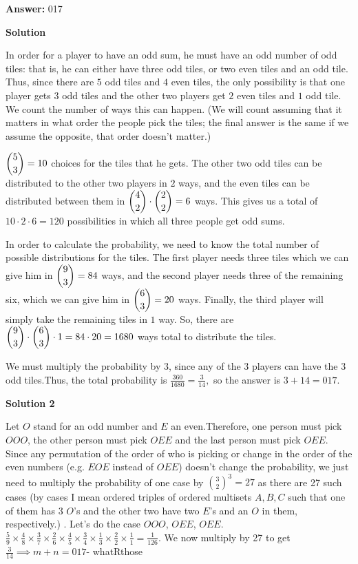 \begin{enumerate}
 \textbf{Answer: }017



\textbf{Solution}

In order for a player to have an odd sum, he must have an odd number of odd tiles: that is, he can either have three odd tiles, or two even tiles and an odd tile.  Thus, since there are $5$ odd tiles and $4$ even tiles, the only possibility is that one player gets $3$ odd tiles and the other two players get $2$ even tiles and $1$ odd tile.  We count the number of ways this can happen. (We will count assuming that it matters in what order the people pick the tiles; the final answer is the same if we assume the opposite, that order doesn't matter.)

 $\dbinom{5}{3} = 10$ choices for the tiles that he gets.  The other two odd tiles can be distributed to the other two players in $2$ ways, and the even tiles can be distributed between them in $\dbinom{4}{2} \cdot \dbinom{2}{2} = 6$ ways.  This gives us a total of  $10 \cdot 2 \cdot 6 = 120$ possibilities in which all three people get odd sums.

 In order to calculate the probability, we need to know the total number of possible distributions for the tiles.  The first player needs three tiles which we can give him in $\dbinom{9}{3} = 84$ ways, and the second player needs three of the remaining six, which we can give him in $\dbinom{6}{3} = 20$ ways. Finally, the third player will simply take the remaining tiles in $1$ way. So, there are $\dbinom{9}{3} \cdot \dbinom{6}{3} \cdot 1 = 84 \cdot 20 = 1680$ ways total to distribute the tiles.

 We must multiply the probability by 3, since any of the 3 players can have the 3 odd tiles.Thus, the total probability is $\frac{360}{1680} = \frac{3}{14},$ so the answer is $3 + 14 = \boxed{017}$.

 



\textbf{Solution 2}

Let $O$ stand for an odd number and $E$ an even.Therefore, one person must pick $OOO$, the other person must pick $OEE$ and the last person must pick $OEE$. Since any permutation of the order of who is picking or change in the order of the even numbers (e.g. $EOE$ instead of $OEE$) doesn't change the probability, we just need to multiply the probability of one case by $\binom{3}{2}^3 = 27$ as there are 27 such cases (by cases I mean ordered triples of ordered multisets $A, B, C$ such that one of them has 3 $O$'s and the other two have two $E$'s and an $O$ in them, respectively.) . Let's do the case $OOO$, $OEE$, $OEE$.$\frac{5}{9} \times \frac{4}{8} \times \frac{3}{7} \times \frac{2}{6} \times \frac{4}{5} \times \frac{3}{4} \times \frac{1}{3} \times \frac{2}{2} \times \frac{1}{1} = \frac{1}{126}$. We now multiply by 27 to get $\frac{3}{14} \implies m + n = \boxed{017}$- whatRthose


\end{enumerate}
